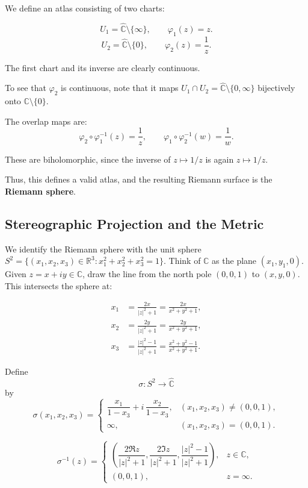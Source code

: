 \documentclass[
]{book}
\theoremstyle{definition}
\theoremstyle{definition}
\theoremstyle{definition}
\theoremstyle{definition}
\theoremstyle{remark}
\begin{document}
We define an atlas consisting of two charts:

\[
U_1 = \widehat{\mathbb{C}} \setminus \{\infty\}, \qquad 
\varphi_1(z) = z.
\]
\[
U_2 = \widehat{\mathbb{C}} \setminus \{0\}, \qquad 
\varphi_2(z) = \frac{1}{z}.
\]

The first chart and its inverse are clearly continuous.

To see that \(\varphi_2\) is continuous, note that it maps \(U_1 \cap U_2 = \widehat{\mathbb{C}} \setminus \{0,\infty\}\) bijectively onto \(\mathbb{C} \setminus \{0\}\).

The overlap maps are:
\[
\varphi_2 \circ \varphi_1^{-1}(z) = \frac{1}{z}, \qquad
\varphi_1 \circ \varphi_2^{-1}(w) = \frac{1}{w}.
\]

These are biholomorphic, since the inverse of \(z \mapsto 1/z\) is again \(z \mapsto 1/z\).

Thus, this defines a valid atlas, and the resulting Riemann surface is the \textbf{Riemann sphere}.

\subsection{Stereographic Projection and the Metric}\label{stereographic-projection-and-the-metric}

We identify the Riemann sphere with the unit sphere \(S^2 = \{(x_1,x_2,x_3) \in \mathbb{R}^3 : x_1^2 + x_2^2 + x_3^2 = 1\}.\) Think of \(\mathbb{C}\) as the plane \((x_1,y_1,0)\). Given \(z = x + iy \in \mathbb{C}\), draw the line from the north pole \((0,0,1)\) to \((x,y,0)\).\\
This intersects the sphere at:

\begin{align*}
x_1 &= \frac{2x}{|z|^2+1}
     = \frac{2x}{x^2 + y^2 + 1},\\
x_2 &= \frac{2y}{|z|^2+1}
     = \frac{2y}{x^2 + y^2 + 1},\\
x_3 &= \frac{|z|^2-1}{|z|^2+1}
     = \frac{x^2 + y^2 - 1}{x^2 + y^2 + 1}.
\end{align*}

Define
\[
\sigma : S^2 \to \widehat{\mathbb{C}}
\]
by
\[
\sigma(x_1,x_2,x_3) =
\begin{cases}
\dfrac{x_1}{1 - x_3} + i\,\dfrac{x_2}{1 - x_3}, & (x_1,x_2,x_3) \neq (0,0,1), \\[1em]
\infty, & (x_1,x_2,x_3) = (0,0,1).
\end{cases}
\]

\[
\sigma^{-1}(z) =
\begin{cases}
\left(
\dfrac{2\Re z}{|z|^2 + 1},
\dfrac{2\Im z}{|z|^2 + 1},
\dfrac{|z|^2 - 1}{|z|^2 + 1}
\right), & z \in \mathbb{C}, \\[1em]
(0,0,1), & z = \infty.
\end{cases}
\]
\end{document}
